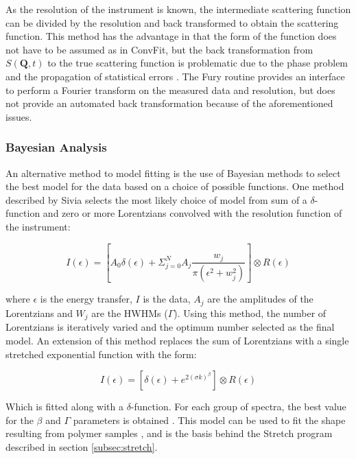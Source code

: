 \documentclass[paper=a4, fontsize=11pt]{scrartcl}	%
\numberwithin{equation}{section}															%
\numberwithin{figure}{section}																%
\numberwithin{table}{section}																%
\begin{document}
As the resolution of the instrument is known, the intermediate scattering function can be divided by the resolution and back transformed to obtain the scattering function. This method has the advantage in that the form of the function does not have to be assumed as in ConvFit, but the back transformation from $S(\mathbf{Q}, t)$ to the true scattering function is problematic due to the phase problem \cite{dssivia2011} and the propagation of statistical errors \cite{wild1977measurement}. The Fury routine provides an interface to perform a Fourier transform on the measured data and resolution, but does not provide an automated back transformation because of the aforementioned issues.

\subsubsection{Bayesian Analysis}
An alternative method to model fitting is the use of Bayesian methods to select the best model for the data based on a choice of possible functions. One method described by Sivia \cite{dssivia1992} selects the most likely choice of model from sum of a $\delta$-function and zero or more Lorentzians convolved with the resolution function of the instrument: 

\begin{equation}
I(\epsilon) = [A_0\delta(\epsilon) + \Sigma_{j=0}^N A_j \frac{w_j}{\pi(\epsilon^2 + w_j^2)}] \otimes R(\epsilon)
\end{equation}

where $\epsilon$ is the energy transfer, $I$ is the data, $A_j$ are the amplitudes of the Lorentzians and $W_j$ are the HWHMs ($\Gamma$). Using this method, the number of Lorentzians is iteratively varied and the optimum number selected as the final model. An extension of this method replaces the sum of Lorentzians with a single stretched exponential function with the form:

\begin{equation}
I(\epsilon) = [\delta(\epsilon) + e^{2(\sigma k)^\beta}] \otimes R(\epsilon)
\end{equation}

Which is fitted along with a $\delta$-function. For each group of spectra, the best value for the $\beta$ and $\Gamma$ parameters is obtained \cite{wshowells2010}. This model can be used to fit the shape resulting from polymer samples \cite{wshowells1996}\cite{higgins1977observation}\cite{higgins1977q},  and is the basis behind the Stretch program described in section \ref{subsec:stretch}.
\end{document}
